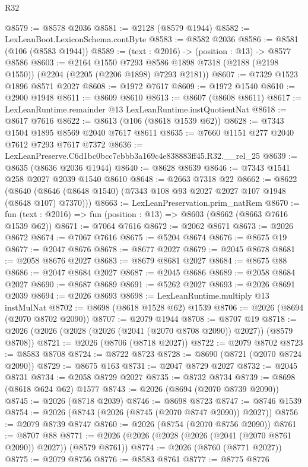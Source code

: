 \begin{lexlean}{R32}
\begin{coremodule}
@8579 := @8578 @2036
@8581 := @2128 (@8579 @1944)
@8582 := LexLeanBoot.LexiconSchema.contByte
@8583 := @8582 @2036
@8586 := @8581 (@106 (@8583 @1944))
@8589 := (text : @2016) -> (position : @13) -> @8577 @8586
@8603 := @2164
    @1550
    @7293
    @8586
    @1898
    @7318
    (@2188 (@2198 @1550))
    (@2204 (@2205 (@2206 @1898) @7293 @2181))
@8607 := @7329 @1523 @1896 @8571 @2027
@8608 := @1972 @7617
@8609 := @1972 @1540
@8610 := @2900 @1948
@8611 := @8609 @8610
@8613 := @8607 (@8608 @8611)
@8617 := LexLeanRuntime.remainder @13 LexLeanRuntime.instQuotientNat
@8618 := @8617 @7616
@8622 := @8613 (@106 (@8618 @1539 @62))
@8628 := @7343 @1504 @1895 @8569 @2040 @7617 @8611
@8635 := @7660 @1151 @277 @2040 @7612 @7293 @7617 @7372
@8636 := LexLeanPreserve.C6d1bc0bcc7cbbb3a169c4e838883ff45.R32.__rel_25
@8639 := @8635 (@8636 @2036 @1944)
@8640 := @8628 @8639
@8646 := @7343 @1541 @258 @2027 @2039 @1540 @8610
@8648 := @2663 @7318 @22
@8662 := @8622
    (@8640 (@8646 (@8648 @1540) (@7343 @108 @93 @2027 @2027 @107 @1948 (@8648 @107) @7370)))
@8663 := LexLeanPreservation.prim_natRem
@8670 := fun (text : @2016) => fun (position : @13) => @8603 (@8662 (@8663 @7616 @1539 @62))
@8671 := @7064 @7616
@8672 := @2062 @8671
@8673 := @2026 @8672
@8674 := @7067 @7616
@8675 := @5204 @8674
@8676 := @8675 @19
@8677 := @2047 @8676
@8678 := @8677 @2027
@8679 := @2045 @8678
@8681 := @2058 @8676 @2027
@8683 := @8679 @8681 @2027
@8684 := @8675 @88
@8686 := @2047 @8684 @2027
@8687 := @2045 @8686
@8689 := @2058 @8684 @2027
@8690 := @8687 @8689
@8691 := @5262 @2027
@8693 := @2026 @8691 @2039
@8694 := @2026 @8693
@8698 := LexLeanRuntime.multiply @13 instMulNat
@8702 := @8698 (@8618 @1528 @62) @1539
@8706 := @2026 (@8694 (@2070 @8702 @2090))
@8707 := @2079 @1944
@8708 := @8707 @19
@8718 := @2026 (@2026 (@2028 (@2026 (@2041 (@2070 @8708 @2090)) @2027)) (@8579 @8708))
@8721 := @2026 (@8706 (@8718 @2027))
@8722 := @2079 @8702
@8723 := @8583 @8708
@8724 := @8722 @8723
@8728 := @8690 (@8721 (@2070 @8724 @2090))
@8729 := @8675 @163
@8731 := @2047 @8729 @2027
@8732 := @2045 @8731
@8734 := @2058 @8729 @2027
@8735 := @8732 @8734
@8739 := @8698 (@8618 @624 @62) @1577
@8743 := @2026 (@8694 (@2070 @8739 @2090))
@8745 := @2026 (@8718 @2039)
@8746 := @8698 @8723
@8747 := @8746 @1539
@8754 := @2026 (@8743 (@2026 (@8745 (@2070 @8747 @2090)) @2027))
@8756 := @2079 @8739 @8747
@8760 := @2026 (@8754 (@2070 @8756 @2090))
@8761 := @8707 @88
@8771 := @2026 (@2026 (@2028 (@2026 (@2041 (@2070 @8761 @2090)) @2027)) (@8579 @8761))
@8774 := @2026 (@8760 (@8771 @2027))
@8775 := @2079 @8756
@8776 := @8583 @8761
@8777 := @8775 @8776

\end{coremodule}
\end{lexlean}
